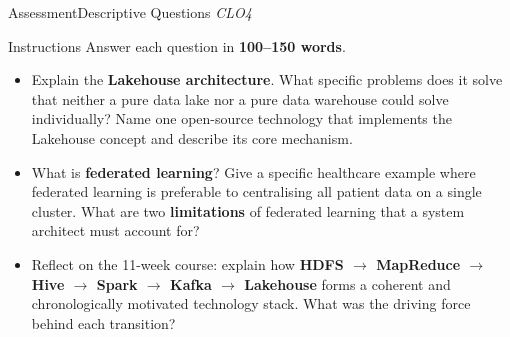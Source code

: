 \documentclass[aspectratio=169,10pt]{beamer}
\begin{document}
\begin{frame}{Assessment\textemdash Descriptive Questions \hfill\small\textit{CLO4}}
  \begin{block}{Instructions}
    Answer each question in \textbf{100--150 words}.
  \end{block}
  \vspace{6pt}
  \begin{itemize}
    \item[\textbf{D1.}] Explain the \textbf{Lakehouse architecture}.  What specific problems does it solve that neither a pure data lake nor a pure data warehouse could solve individually?  Name one open-source technology that implements the Lakehouse concept and describe its core mechanism.
  \end{itemize}
  \vspace{8pt}
  \begin{itemize}
    \item[\textbf{D2.}] What is \textbf{federated learning}?  Give a specific healthcare example where federated learning is preferable to centralising all patient data on a single cluster.  What are two \textbf{limitations} of federated learning that a system architect must account for?
  \end{itemize}
  \vspace{8pt}
  \begin{itemize}
    \item[\textbf{D3.}] Reflect on the 11-week course: explain how \textbf{HDFS $\to$ MapReduce $\to$ Hive $\to$ Spark $\to$ Kafka $\to$ Lakehouse} forms a coherent and chronologically motivated technology stack.  What was the driving force behind each transition?
  \end{itemize}
\end{frame}
\end{document}
